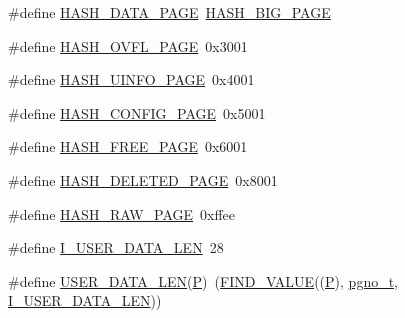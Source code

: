 \begin{DoxyCompactItemize}
\item 
\#define \mbox{\hyperlink{adat-devel_2other__libs_2filedb_2filehash_2ffdb__page_8h_a3da3571fb65661a4d99ac4883fed116f}{H\+A\+S\+H\+\_\+\+D\+A\+T\+A\+\_\+\+P\+A\+GE}}~\mbox{\hyperlink{adat__devel_2other__libs_2filedb_2filehash_2ffdb__page_8h_a204f642fe436cbe79284400bdf2f84df}{H\+A\+S\+H\+\_\+\+B\+I\+G\+\_\+\+P\+A\+GE}}
\item 
\#define \mbox{\hyperlink{adat-devel_2other__libs_2filedb_2filehash_2ffdb__page_8h_a2865039c0954e89d8e43a5ba83fc99e4}{H\+A\+S\+H\+\_\+\+O\+V\+F\+L\+\_\+\+P\+A\+GE}}~0x3001
\item 
\#define \mbox{\hyperlink{adat-devel_2other__libs_2filedb_2filehash_2ffdb__page_8h_a776a8db1281760c0391de16ecea22520}{H\+A\+S\+H\+\_\+\+U\+I\+N\+F\+O\+\_\+\+P\+A\+GE}}~0x4001
\item 
\#define \mbox{\hyperlink{adat-devel_2other__libs_2filedb_2filehash_2ffdb__page_8h_af82dcdaf72d2b21a8273e569fdb9a19e}{H\+A\+S\+H\+\_\+\+C\+O\+N\+F\+I\+G\+\_\+\+P\+A\+GE}}~0x5001
\item 
\#define \mbox{\hyperlink{adat-devel_2other__libs_2filedb_2filehash_2ffdb__page_8h_af0b7407ac5e3053ab8b22ef4b37b8cb7}{H\+A\+S\+H\+\_\+\+F\+R\+E\+E\+\_\+\+P\+A\+GE}}~0x6001
\item 
\#define \mbox{\hyperlink{adat-devel_2other__libs_2filedb_2filehash_2ffdb__page_8h_a8eb5651a9b1ae27c413db87188f2d9ce}{H\+A\+S\+H\+\_\+\+D\+E\+L\+E\+T\+E\+D\+\_\+\+P\+A\+GE}}~0x8001
\item 
\#define \mbox{\hyperlink{adat-devel_2other__libs_2filedb_2filehash_2ffdb__page_8h_a96ca993348e026b252a70bc1afc966ab}{H\+A\+S\+H\+\_\+\+R\+A\+W\+\_\+\+P\+A\+GE}}~0xffee
\item 
\#define \mbox{\hyperlink{adat-devel_2other__libs_2filedb_2filehash_2ffdb__page_8h_a61a64217e47ee349666e6a45e0eb2faf}{I\+\_\+\+U\+S\+E\+R\+\_\+\+D\+A\+T\+A\+\_\+\+L\+EN}}~28
\item 
\#define \mbox{\hyperlink{adat-devel_2other__libs_2filedb_2filehash_2ffdb__page_8h_a4732458d206f95f8a3090ba02d624709}{U\+S\+E\+R\+\_\+\+D\+A\+T\+A\+\_\+\+L\+EN}}(\mbox{\hyperlink{adat__devel_2lib_2hadron_2operator__name__util_8cc_aef94be98e2c9e4a4dece75f60ca9792c}{P}})~(\mbox{\hyperlink{adat__devel_2other__libs_2filedb_2filehash_2ffdb__page_8h_aac067124fe4d81f5306f4e2131e1121e}{F\+I\+N\+D\+\_\+\+V\+A\+L\+UE}}((\mbox{\hyperlink{adat__devel_2lib_2hadron_2operator__name__util_8cc_aef94be98e2c9e4a4dece75f60ca9792c}{P}}), \mbox{\hyperlink{adat-devel_2other__libs_2filedb_2filehash_2ffdb__db_8h_a000813331643d38481142bcce7de1501}{pgno\+\_\+t}}, \mbox{\hyperlink{adat__devel_2other__libs_2filedb_2filehash_2ffdb__page_8h_a61a64217e47ee349666e6a45e0eb2faf}{I\+\_\+\+U\+S\+E\+R\+\_\+\+D\+A\+T\+A\+\_\+\+L\+EN}}))

\end{DoxyCompactItemize}
